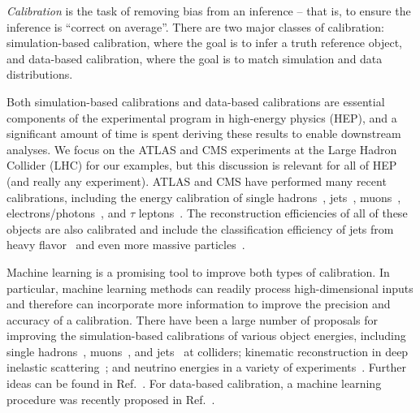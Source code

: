 \documentclass[aps,prd,reprint,preprintnumbers,superscriptaddress,nofootinbib,longbibliography,floatfix]{revtex4-1}
\DeclareRobustCommand{\Ref}[1]{Ref.~\cite{#1}}
\begin{document}
\textit{Calibration} is the task of removing bias from an inference -- that is, to ensure the inference is ``correct on average''.
%
There are two major classes of calibration: simulation-based calibration, where the goal is to infer a truth reference object, and data-based calibration, where the goal is to match simulation and data distributions.



Both simulation-based calibrations and data-based calibrations are essential components of the experimental program in high-energy physics (HEP), and a significant amount of time is spent deriving these results to enable downstream analyses.
%
We focus on the ATLAS and CMS experiments at the Large Hadron Collider (LHC) for our examples, but this discussion is relevant for all of HEP (and really any experiment).
%
ATLAS and CMS have performed many recent calibrations, including the energy calibration of single hadrons~\cite{ATLAS:2016krp,CMS:2017yfk}, jets~\cite{ATLAS:2020cli,CMS:2016lmd}, muons~\cite{ATLAS:2016lqx,CMS:2019ied}, electrons/photons~\cite{ATLAS:2019qmc,CMS:2015myp,CMS:2015xaf}, and $\tau$ leptons~\cite{ATLAS:2014rzk,CMS:2018jrd}.
%
The reconstruction efficiencies of all of these objects are also calibrated and include the classification efficiency of jets from heavy flavor~\cite{ATLAS:2019bwq,CMS:2017wtu} and even more massive particles~\cite{ATLAS:2018wis,CMS:2020poo}.


Machine learning is a promising tool to improve both types of calibration.
%
In particular, machine learning methods can readily process high-dimensional inputs and therefore can incorporate more information to improve the precision and accuracy of a calibration.
%
There have been a large number of proposals for improving the simulation-based calibrations of various object energies, including single hadrons~\cite{Belayneh:2019vyx,ATL-PHYS-PUB-2020-018,Akchurin:2021afn,Akchurin:2021ahx,Polson:2021kvr,Pata:2021oez}, muons~\cite{Kieseler:2021jxc}, and jets~\cite{ATL-PHYS-PUB-2018-013,ATL-PHYS-PUB-2020-001,CMS:2019uxx,Haake:2018hqn,Haake:2019pqd,Baldi:2020hjm,Komiske:2017ubm,ATL-PHYS-PUB-2019-028,Maier_2022,Kasieczka:2020vlh,ArjonaMartinez:2018eah} at colliders; kinematic reconstruction in deep inelastic scattering~\cite{Diefenthaler:2021rdj}; and neutrino energies in a variety of experiments~\cite{Liu:2020pzv,EXO:2018bpx,Baldi:2018qhe,Abbasi:2021ryj,IceCube:2020yct,Carloni:2021zbc}.
%
Further ideas can be found in \Ref{Feickert:2021ajf}.
%
For data-based calibration, a machine learning procedure was recently proposed in \Ref{Pollard:2021fqv}.
\end{document}
